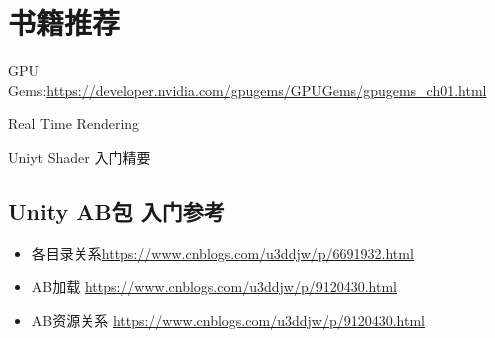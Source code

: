 \documentclass[UTF8,a4paper,12pt]{ctexbook}
\begin{document}
\chapter{书籍推荐}
	
	GPU Gems:\url{https://developer.nvidia.com/gpugems/GPUGems/gpugems_ch01.html}
	
	Real Time Rendering
	
	Uniyt Shader 入门精要
	
	\section{Unity AB包 入门参考}
		\begin{itemize}
			\item 各目录关系\url{https://www.cnblogs.com/u3ddjw/p/6691932.html}
			\item AB加载 \url{https://www.cnblogs.com/u3ddjw/p/9120430.html}
			\item AB资源关系 \url{https://www.cnblogs.com/u3ddjw/p/9120430.html}
		\end{itemize}
		
\end{document}
